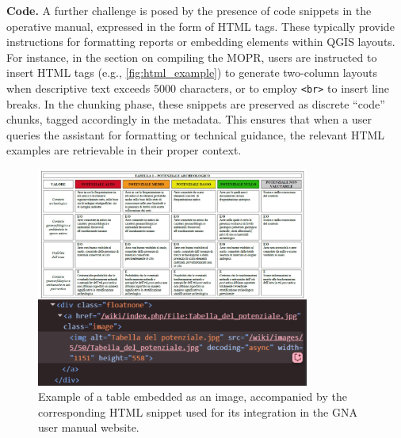 \begin{spacing}{1.5}
\textbf{Code. }A further challenge is posed by the presence of code snippets in the operative manual, expressed in the form of HTML tags. These typically provide instructions for formatting reports or embedding elements within QGIS layouts. For instance, in the section on compiling the MOPR, users are instructed to insert HTML tags (e.g., \autoref{fig:html_example}) to generate two-column layouts when descriptive text exceeds 5000 characters, or to employ \texttt{<br>} to insert line breaks. In the chunking phase, these snippets are preserved as discrete ``code'' chunks, tagged accordingly in the metadata. This ensures that when a user queries the assistant for formatting or technical guidance, the relevant HTML examples are retrievable in their proper context.\\

\begin{figure}[H]
  \centering
  \includegraphics[width=0.8\textwidth]{images/merged.jpg} 
  \caption{Example of a table embedded as an image, accompanied by the corresponding HTML snippet used for its integration in the GNA user manual website.}
  \label{fig:example_image}
\end{figure}


\end{spacing}
